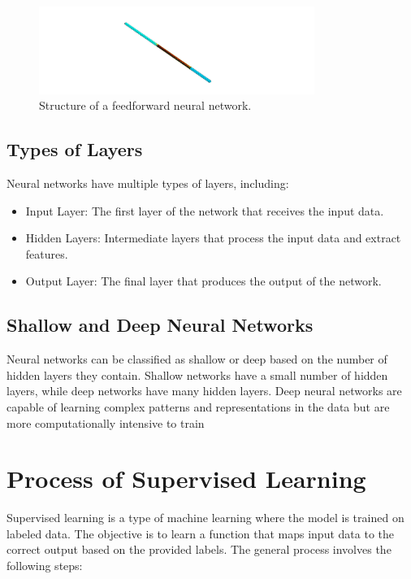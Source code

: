 \documentclass{report}
\begin{document}
        \begin{figure}[h]
            \centering
            \includegraphics[width=0.8\textwidth]{00_Images/00_Velocity.png}
            \caption{Structure of a feedforward neural network.}
            \label{fig:neural_network}
        \end{figure}

        \subsection{Types of Layers}
        \noindent Neural networks have multiple types of layers, including:
            \begin{itemize}
                \item Input Layer: The first layer of the network that receives the input data.
                \item Hidden Layers: Intermediate layers that process the input data and extract features.
                \item Output Layer: The final layer that produces the output of the network.
            \end{itemize}
        \subsection{Shallow and Deep Neural Networks}
            \noindent Neural networks can be classified as shallow or deep based on the number of hidden layers they contain. Shallow networks have a small number of hidden layers, while deep networks have many hidden layers. Deep neural networks are capable of learning complex patterns and representations in the data but are more computationally intensive to train

    \section{Process of Supervised Learning}
        Supervised learning is a type of machine learning where the model is trained on labeled data. The objective is to learn a function that maps input data to the correct output based on the provided labels. The general process involves the following steps:
\end{document}
